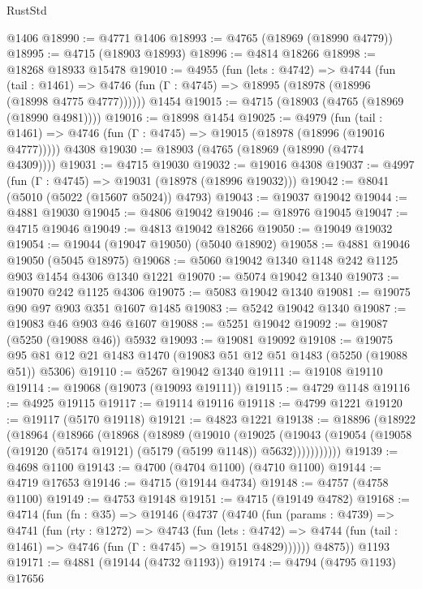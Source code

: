 \begin{lexlean}{RustStd}
\begin{coremodule}
    @1406
@18990 := @4771 @1406
@18993 := @4765 (@18969 (@18990 @4779))
@18995 := @4715 (@18903 @18993)
@18996 := @4814 @18266
@18998 := @18268 @18933 @15478
@19010 := @4955
    (fun (lets : @4742) =>
    @4744
      (fun (tail : @1461) =>
      @4746 (fun (Γ : @4745) => @18995 (@18978 (@18996 (@18998 @4775 @4777))))))
    @1454
@19015 := @4715 (@18903 (@4765 (@18969 (@18990 @4981))))
@19016 := @18998 @1454
@19025 := @4979
    (fun (tail : @1461) => @4746 (fun (Γ : @4745) => @19015 (@18978 (@18996 (@19016 @4777)))))
    @4308
@19030 := @18903 (@4765 (@18969 (@18990 (@4774 @4309))))
@19031 := @4715 @19030
@19032 := @19016 @4308
@19037 := @4997 (fun (Γ : @4745) => @19031 (@18978 (@18996 @19032)))
@19042 := @8041 (@5010 (@5022 (@15607 @5024)) @4793)
@19043 := @19037 @19042
@19044 := @4881 @19030
@19045 := @4806 @19042
@19046 := @18976 @19045
@19047 := @4715 @19046
@19049 := @4813 @19042 @18266
@19050 := @19049 @19032
@19054 := @19044 (@19047 @19050) (@5040 @18902)
@19058 := @4881 @19046 @19050 (@5045 @18975)
@19068 := @5060 @19042 @1340 @1148 @242 @1125 @903 @1454 @4306 @1340 @1221
@19070 := @5074 @19042 @1340
@19073 := @19070 @242 @1125 @4306
@19075 := @5083 @19042 @1340
@19081 := @19075 @90 @97 @903 @351 @1607 @1485
@19083 := @5242 @19042 @1340
@19087 := @19083 @46 @903 @46 @1607
@19088 := @5251 @19042
@19092 := @19087 (@5250 (@19088 @46)) @5932
@19093 := @19081 @19092
@19108 := @19075 @95 @81 @12 @21 @1483 @1470 (@19083 @51 @12 @51 @1483 (@5250 (@19088 @51)) @5306)
@19110 := @5267 @19042 @1340
@19111 := @19108 @19110
@19114 := @19068 (@19073 (@19093 @19111))
@19115 := @4729 @1148
@19116 := @4925 @19115
@19117 := @19114 @19116
@19118 := @4799 @1221
@19120 := @19117 (@5170 @19118)
@19121 := @4823 @1221
@19138 := @18896
    (@18922
      (@18964
        (@18966
          (@18968
            (@18989
              (@19010
                (@19025
                  (@19043
                    (@19054 (@19058 (@19120 (@5174 @19121) (@5179 (@5199 @1148)) @5632)))))))))))
@19139 := @4698 @1100
@19143 := @4700 (@4704 @1100) (@4710 @1100)
@19144 := @4719 @17653
@19146 := @4715 (@19144 @4734)
@19148 := @4757 (@4758 @1100)
@19149 := @4753 @19148
@19151 := @4715 (@19149 @4782)
@19168 := @4714
    (fun (fn : @35) =>
    @19146
      (@4737
        (@4740
          (fun (params : @4739) =>
          @4741
            (fun (rty : @1272) =>
            @4743
              (fun (lets : @4742) =>
              @4744 (fun (tail : @1461) => @4746 (fun (Γ : @4745) => @19151 @4829))))))
        @4875))
    @1193
@19171 := @4881 (@19144 (@4732 @1193))
@19174 := @4794 (@4795 @1193) @17656

\end{coremodule}
\end{lexlean}

